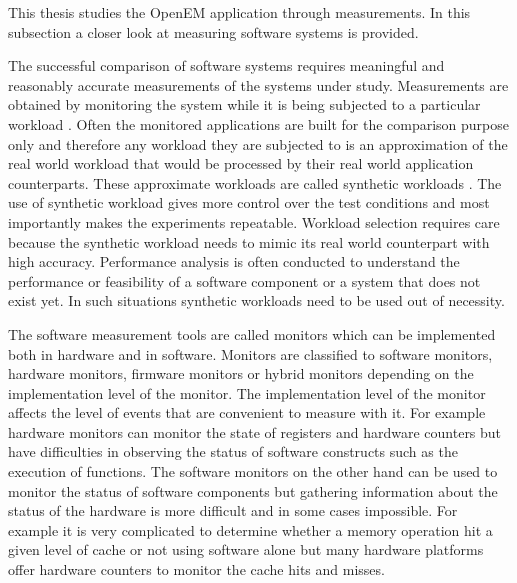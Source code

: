 This thesis studies the OpenEM application through measurements. In this subsection a closer look at measuring software systems is provided.

The successful comparison of software systems requires meaningful and reasonably accurate measurements of the systems under study. Measurements are obtained by monitoring the system while it is being subjected to a particular workload \cite{jain1991art}. Often the monitored applications are built for the comparison purpose only and therefore any workload they are subjected to is an approximation of the real world workload that would be processed by their real world application counterparts. These approximate workloads are called synthetic workloads \cite{jain1991art}. The use of synthetic workload gives more control over the test conditions and most importantly makes the experiments repeatable. Workload selection requires care because the synthetic workload needs to mimic its real world counterpart with high accuracy. Performance analysis is often conducted to understand the performance or feasibility of a software component or a system that does not exist yet. In such situations synthetic workloads need to be used out of necessity.  

The software measurement tools are called monitors which can be implemented both in hardware and in software. Monitors are classified to software monitors, hardware monitors, firmware monitors or hybrid monitors depending on the implementation level of the monitor. The implementation level of the monitor affects the level of events that are convenient to measure with it. For example hardware monitors can monitor the state of registers and hardware counters but have difficulties in observing the status of software constructs such as the execution of functions. The software monitors on the other hand can be used to monitor the status of software components but gathering information about the status of the hardware is more difficult and in some cases impossible. \cite{jain1991art} For example it is very complicated to determine whether a memory operation hit a given level of cache or not using software alone but many hardware platforms offer hardware counters to monitor the cache hits and misses.


